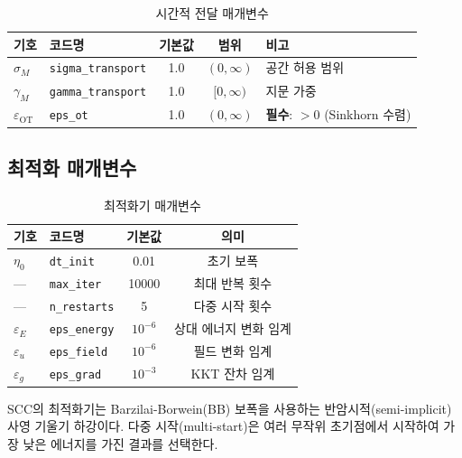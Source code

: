 \begin{table}[h]
\centering
\caption{시간적 전달 매개변수}
\label{tab:transport-params}
\begin{tabular}{llccp{5cm}}
\hline
\textbf{기호} & \textbf{코드명} & \textbf{기본값} & \textbf{범위} & \textbf{비고} \\
\hline
$\sigma_M$ & \texttt{sigma\_transport} & 1.0 & $(0, \infty)$ & 공간 허용 범위 \\
$\gamma_M$ & \texttt{gamma\_transport} & 1.0 & $[0, \infty)$ & 지문 가중 \\
$\varepsilon_{\mathrm{OT}}$ & \texttt{eps\_ot} & 1.0 & $(0, \infty)$ & \textbf{필수}: $> 0$ (Sinkhorn 수렴) \\
\hline
\end{tabular}
\end{table}


\subsection{최적화 매개변수}

\begin{table}[h]
\centering
\caption{최적화기 매개변수}
\label{tab:optimizer-params}
\begin{tabular}{llcc}
\hline
\textbf{기호} & \textbf{코드명} & \textbf{기본값} & \textbf{의미} \\
\hline
$\eta_0$ & \texttt{dt\_init} & 0.01 & 초기 보폭 \\
--- & \texttt{max\_iter} & 10000 & 최대 반복 횟수 \\
--- & \texttt{n\_restarts} & 5 & 다중 시작 횟수 \\
$\varepsilon_E$ & \texttt{eps\_energy} & $10^{-6}$ & 상대 에너지 변화 임계 \\
$\varepsilon_u$ & \texttt{eps\_field} & $10^{-6}$ & 필드 변화 임계 \\
$\varepsilon_g$ & \texttt{eps\_grad} & $10^{-3}$ & KKT 잔차 임계 \\
\hline
\end{tabular}
\end{table}

SCC의 최적화기는 Barzilai-Borwein(BB) 보폭을 사용하는 반암시적(semi-implicit) 사영 기울기 하강이다. 다중 시작(multi-start)은 여러 무작위 초기점에서 시작하여 가장 낮은 에너지를 가진 결과를 선택한다.
